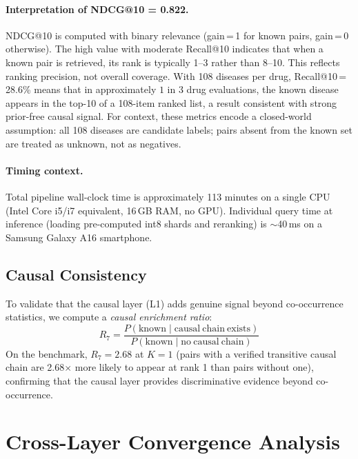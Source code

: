 \documentclass[11pt]{article}
\begin{document}
\paragraph{Interpretation of NDCG@10 = 0.822.}
NDCG@10 is computed with binary relevance (gain\,=\,1 for known pairs,
gain\,=\,0 otherwise).
The high value with moderate Recall@10 indicates that when a known pair
is retrieved, its rank is typically 1--3 rather than 8--10.
This reflects ranking precision, not overall coverage.
With 108 diseases per drug, Recall@10\,=\,28.6\% means that in approximately
$1$ in $3$ drug evaluations, the known disease appears in the top-10
of a 108-item ranked list, a result consistent with strong prior-free
causal signal.
For context, these metrics encode a closed-world assumption:
all 108 diseases are candidate labels; pairs absent from the known set
are treated as unknown, not as negatives.

\paragraph{Timing context.}
Total pipeline wall-clock time is approximately 113 minutes on a single
CPU (Intel Core i5/i7 equivalent, 16\,GB RAM, no GPU).
Individual query time at inference (loading pre-computed int8 shards
and reranking) is ${\sim}$40\,ms on a Samsung Galaxy A16 smartphone.

\subsection{Causal Consistency}
\label{sec:causal-consistency}

To validate that the causal layer (L1) adds genuine signal beyond
co-occurrence statistics, we compute a \emph{causal enrichment ratio}:
\[
  R_7 = \frac{P(\mathrm{known} \mid \mathrm{causal\ chain\ exists})}{
               P(\mathrm{known} \mid \mathrm{no\ causal\ chain})}
\]
On the benchmark, $R_7 = 2.68$ at $K = 1$ (pairs with a verified
transitive causal chain are 2.68$\times$ more likely to appear at
rank 1 than pairs without one), confirming that the causal layer
provides discriminative evidence beyond co-occurrence.

\section{Cross-Layer Convergence Analysis}
\label{sec:convergence}
\end{document}
